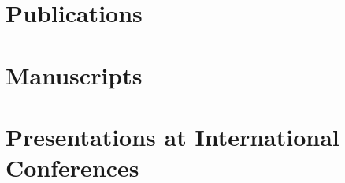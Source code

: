 \section{Publications}
\lipsum[1]

\section{Manuscripts}
\lipsum[1]

\section{Presentations at International Conferences}
\lipsum[1]

